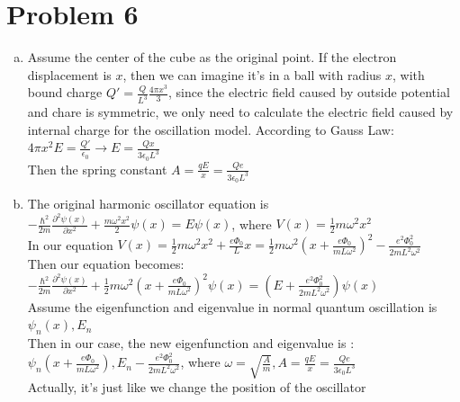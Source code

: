 \documentclass[a4paper]{article}
\begin{document}
\section{Problem 6}
\begin{enumerate}[(a)]
    \item Assume the center of the cube as the original point. If the electron displacement is $x$, then we can imagine it's in a ball with radius $x$, with bound charge $Q'=\frac{Q}{L^3}\frac{4\pi x^3}{3}$, since the electric field caused by outside potential and chare is symmetric, we only need to calculate the electric field caused by internal charge for the oscillation model. According to Gauss Law: 
    \\$4\pi x^2E=\frac{Q'}{\epsilon_0}\rightarrow E=\frac{Qx}{3\epsilon_0L^3}$
    \\Then the spring constant $A=\frac{qE}{x}=\frac{Qe}{3\epsilon_0L^3}$
    \item The original harmonic oscillator equation is $-\frac{\hbar^2}{2m}\frac{\partial^2\psi(x)}{\partial x^2}+\frac{m\omega^2x^2}{2}\psi(x)=E\psi(x)$, where $V(x)=\frac{1}{2}m\omega^2x^2$ 
    \\In our equation $V(x)=\frac{1}{2}m\omega^2x^2+\frac{e\Phi_0}{L}x=\frac{1}{2}m\omega^2(x+\frac{e\Phi_0}{mL\omega^2})^2-\frac{e^2\Phi_0^2}{2mL^2\omega^2}$ 
    \\Then our equation becomes: $-\frac{\hbar^2}{2m}\frac{\partial^2\psi(x)}{\partial x^2}+\frac{1}{2}m\omega^2(x+\frac{e\Phi_0}{mL\omega^2})^2\psi(x)=(E+\frac{e^2\Phi_0^2}{2mL^2\omega^2})\psi(x)$
    \\Assume the eigenfunction and eigenvalue in normal quantum oscillation is $\psi_n(x),E_n$
    \\Then in our case, the new eigenfunction and eigenvalue is :
    \\$\psi_n(x+\frac{e\Phi_0}{mL\omega^2}),E_n-\frac{e^2\Phi_0^2}{2mL^2\omega^2}$, where $\omega=\sqrt{\frac{A}{m}},A=\frac{qE}{x}=\frac{Qe}{3\epsilon_0L^3}$ 
    \\Actually, it's just like we change the position of the oscillator
\end{enumerate}
    
\end{document}

